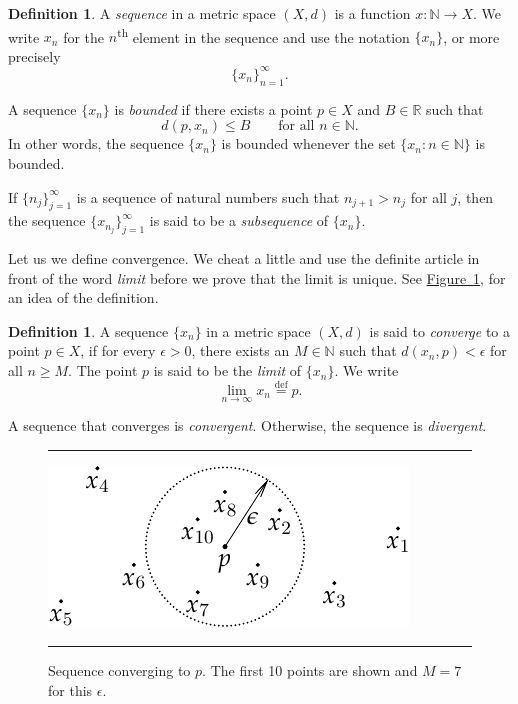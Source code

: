 \documentclass[12pt,openany]{book}
\newcommand{\R}{{\mathbb{R}}}
\newcommand{\N}{{\mathbb{N}}}
\newcommand{\myindex}[1]{#1\index{#1}}
\theoremstyle{plain}
\theoremstyle{remark}
\theoremstyle{definition}
\newtheorem{defn}[thm]{Definition}
\newenvironment{myfig}{%
\begin{figure}[h!t]
\noindent\rule{\textwidth}{0.4pt}\vspace{12pt}\par\centering}%
{\par\noindent\rule{\textwidth}{0.4pt}
\end{figure}}
\theoremstyle{exercise}
\theoremstyle{example}
\newcommand{\figureref}[1]{\hyperref[#1]{Figure~\ref*{#1}}}
\begin{document}
\begin{defn}
A \emph{\myindex{sequence}} in a metric space $(X,d)$ is a function
$x \colon \N \to X$.  We write $x_n$ for the $n$\textsuperscript{th} element in
the sequence and use the notation $\{ x_n \}$, or more precisely
\begin{equation*}
\{ x_n \}_{n=1}^\infty .
\end{equation*}

A sequence $\{ x_n \}$ is \emph{bounded} if
there exists a point $p \in X$ and $B \in \R$ such that
\begin{equation*}
d(p,x_n) \leq B \qquad \text{for all } n \in \N.
\end{equation*}
In other words, the sequence $\{x_n\}$ is bounded whenever
the set $\{ x_n : n \in \N \}$
is bounded.

If $\{ n_j \}_{j=1}^\infty$ is a sequence of natural numbers
such that $n_{j+1} > n_j$ for all $j$, then
the sequence $\{ x_{n_j} \}_{j=1}^\infty$
is said to be
a \emph{\myindex{subsequence}} of $\{x_n \}$.
\end{defn}

Let us we define convergence.  We cheat a little
and use the definite article in front of the word \emph{limit}
before we prove that the limit is unique.
See \figureref{fig:sequence-convergence-metric}, for an idea of
the definition.

\begin{defn}
A sequence $\{ x_n \}$ in a metric space $(X,d)$ is said
to \emph{converge} to a point
$p \in X$, if for every $\epsilon > 0$, there exists an $M \in \N$ such
that $d(x_n,p) < \epsilon$ for all $n \geq M$.  The point $p$
is said to be the \emph{limit}
of $\{ x_n \}$.  We write
\begin{equation*}
\lim_{n\to \infty} x_n \overset{\text{def}}{=} p .
\end{equation*}

A sequence
that converges is \emph{convergent}.
Otherwise, the sequence is 
\emph{divergent}.
\begin{myfig}
\includegraphics{figures/sequence-convergence-metric}
\caption{Sequence converging to $p$.  The first 10 points 
are shown and $M=7$ for this $\epsilon$.\label{fig:sequence-convergence-metric}}
\end{myfig}
\end{defn}
\end{document}
